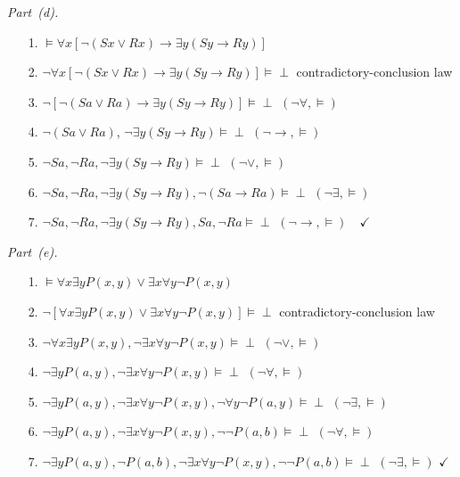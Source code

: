 \documentclass[11pt,letterpaper,oneside,openany]{book}
\begin{document}
\par\medskip\noindent\textit{Part~(d).}\par\nobreak
\begin{enumerate}[leftmargin=3.5em]
\item[1.] $\vDash \forall x[\neg(Sx \lor Rx) \to \exists y(Sy \to Ry)]$
\item[2.] $\neg \forall x[\neg(Sx \lor Rx) \to \exists y(Sy \to Ry)] \vDash \perp$ \quad contradictory-conclusion law
\item[3.] $\neg [\neg(Sa \lor Ra) \to \exists y(Sy \to Ry)] \vDash \perp$ \quad $(\neg \forall, \vDash)$
\item[4.] $\neg(Sa \lor Ra)$, $\neg \exists y(Sy \to Ry) \vDash \perp$ \quad $(\neg \to, \vDash)$
\item[5.] $\neg Sa, \neg Ra, \neg \exists y (Sy \to Ry) \vDash \perp$ \quad $(\neg \lor, \vDash)$
\item[6.] $\neg Sa, \neg Ra, \neg \exists y (Sy \to Ry), \neg (Sa \to Ra) \vDash \perp$ \quad $(\neg \exists, \vDash)$
\item[7.] $\neg Sa, \neg Ra, \neg \exists y(Sy \to Ry), Sa, \neg Ra \vDash \perp$ \quad $(\neg \to, \vDash) \quad \checkmark$
\end{enumerate}

\par\medskip\noindent\textit{Part~(e).}\par\nobreak
\begin{enumerate}[leftmargin=3.5em]
\item[1.] $\vDash \forall x \exists y P(x,y) \lor \exists x \forall y \neg P(x,y)$
\item[2.] $\neg[\forall x \exists y P(x,y) \lor \exists x \forall y \neg P(x,y)] \vDash \perp$ \quad contradictory-conclusion law
\item[3.] $\neg\forall x \exists y P(x,y), \neg\exists x \forall y \neg P(x,y) \vDash \perp$ \quad $(\neg \lor, \vDash)$
\item[4.] $\neg \exists y P(a,y), \neg\exists x \forall y \neg P(x,y) \vDash \perp$ \quad $(\neg \forall, \vDash)$
\item[5.] $\neg \exists y P(a,y), \neg\exists x \forall y \neg P(x,y), \neg \forall y \neg P(a,y) \vDash \perp$ \quad $(\neg \exists, \vDash)$
\item[6.] $\neg \exists y P(a,y), \neg\exists x \forall y \neg P(x,y), \neg \neg P(a,b) \vDash \perp$ \quad $(\neg \forall, \vDash)$
\item[7.] $\neg \exists y P(a,y), \neg P(a,b), \neg\exists x \forall y \neg P(x,y), \neg \neg P(a,b) \vDash \perp$ \quad $(\neg \exists, \vDash)$ \quad $\checkmark$
\end{enumerate}
\end{document}
